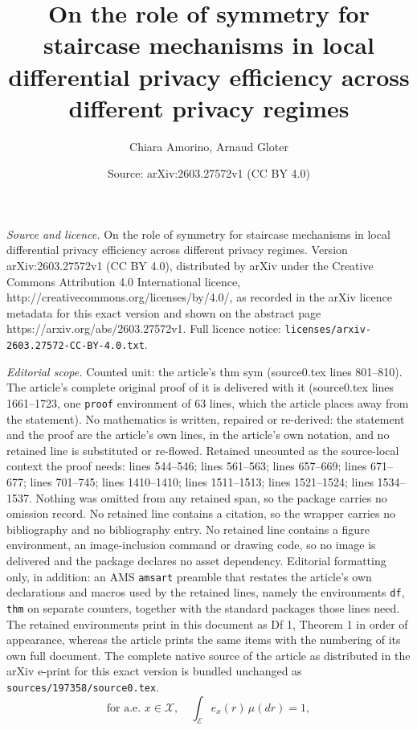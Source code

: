 \documentclass[10pt,a4paper]{amsart}
\title{On the role of symmetry for staircase mechanisms in local differential privacy efficiency across different privacy regimes}
\author{Chiara Amorino, Arnaud Gloter}
\date{Source: arXiv:2603.27572v1 (CC BY 4.0)}
\begin{document}
\maketitle

\noindent\emph{Source and licence.} On the role of symmetry for staircase mechanisms in local differential privacy efficiency across different privacy regimes. Version arXiv:2603.27572v1 (CC BY 4.0), distributed by arXiv under the Creative Commons Attribution 4.0 International licence, http://creativecommons.org/licenses/by/4.0/, as recorded in the arXiv licence metadata for this exact version and shown on the abstract page https://arxiv.org/abs/2603.27572v1. Full licence notice: \texttt{licenses/arxiv-2603.27572-CC-BY-4.0.txt}.\par\smallskip

\noindent\textit{Editorial scope.} Counted unit: the article's thm sym (source0.tex lines 801--810). The article's complete original proof of it is delivered with it (source0.tex lines 1661--1723, one \texttt{proof} environment of 63 lines, which the article places away from the statement). No mathematics is written, repaired or re-derived: the statement and the proof are the article's own lines, in the article's own notation, and no retained line is substituted or re-flowed.  Retained uncounted as the source-local context the proof needs: lines 544--546; lines 561--563; lines 657--669; lines 671--677; lines 701--745; lines 1410--1410; lines 1511--1513; lines 1521--1524; lines 1534--1537.  Nothing was omitted from any retained span, so the package carries no omission record.  No retained line contains a citation, so the wrapper carries no bibliography and no bibliography entry.  No retained line contains a figure environment, an image-inclusion command or drawing code, so no image is delivered and the package declares no asset dependency.  Editorial formatting only, in addition: an AMS \texttt{amsart} preamble that restates the article's own declarations and macros used by the retained lines, namely the environments \texttt{df}, \texttt{thm} on separate counters, together with the standard packages those lines need.  The retained environments print in this document as Df 1, Theorem 1 in order of appearance, whereas the article prints the same items with the numbering of its own full document.  The complete native source of the article as distributed in the arXiv e-print for this exact version is bundled unchanged as \texttt{sources/197358/source0.tex}.
\begin{equation} \label{eq : cond norm mu continue}
    \text{for a.e.\ } x \in \mathcal{X}, \quad \int_{\mathcal{E}} e_x(r) \, \mu(dr) = 1,
\end{equation}
\end{document}
